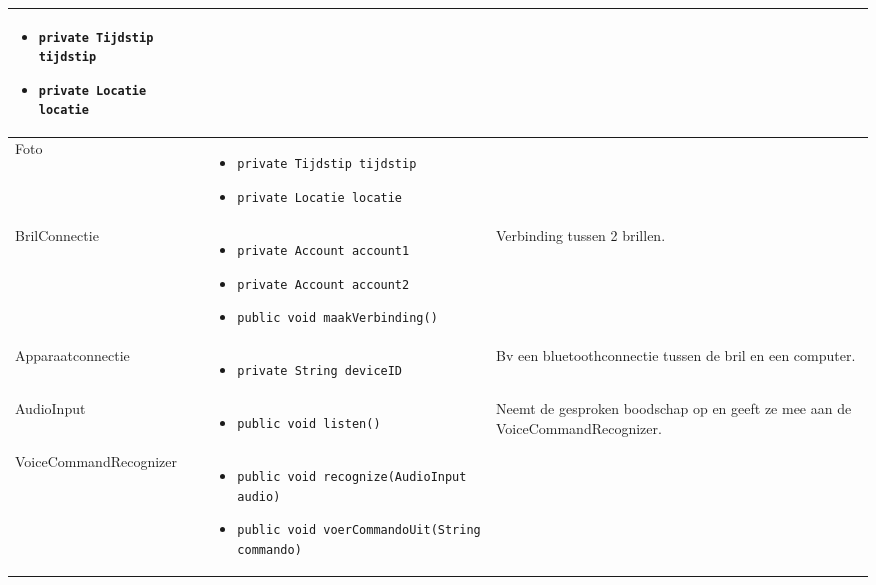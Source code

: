 \documentclass[12pt,a4paper,oneside]{article}
\begin{document}
\begin{longtable}{|l|p{6cm}|p{5cm}|}
\begin{itemize}[parsep=-2pt,leftmargin=0.3cm]
\item \texttt{private Tijdstip tijdstip} 
\item \texttt{private Locatie locatie}\vspace*{-6mm} 
\end{itemize}&\\
\hline
Foto&\vspace*{-10mm}\begin{itemize}[parsep=-2pt,leftmargin=0.3cm]
\item \texttt{private Tijdstip tijdstip} 
\item \texttt{private Locatie locatie}\vspace*{-6mm} 
\end{itemize}&\\
\hline
BrilConnectie&\vspace*{-10mm}\begin{itemize}[parsep=-2pt,leftmargin=0.3cm]
\item \texttt{private Account account1} 
\item \texttt{private Account account2} 
\item \texttt{public void maakVerbinding()}\vspace*{-6mm} 
\end{itemize}&Verbinding tussen 2 brillen.\\
\hline
Apparaatconnectie&\vspace*{-10mm}\begin{itemize}[parsep=-2pt,leftmargin=0.3cm] \item \texttt{private String deviceID} \vspace*{-6mm} 
\end{itemize}&Bv een bluetoothconnectie tussen de bril en een computer.\\
\hline
AudioInput&\vspace*{-10mm}\begin{itemize}[parsep=-2pt,leftmargin=0.3cm] 
\item \texttt{public void listen()} \vspace*{-6mm} 
\end{itemize}&Neemt de gesproken boodschap op en geeft ze mee aan de VoiceCommandRecognizer.\\
\hline
VoiceCommandRecognizer&\vspace*{-10mm}\begin{itemize}[parsep=-2pt,leftmargin=0.3cm] 
\item \texttt{public void recognize(AudioInput audio)} 
\item \texttt{public void voerCommandoUit(String commando)} \vspace*{-6mm} 

\end{itemize}
\end{longtable}
\end{document}
